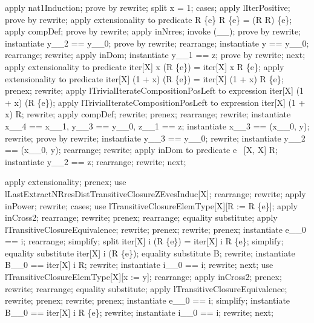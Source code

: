 \begin{LPScript}\begin{forget}[lLastExtractNRresDistTransitiveClosureZEvesInduc]
apply nat1Induction;
prove by rewrite;
split x = 1;
cases;
apply lIterPositive;
prove by rewrite;
apply extensionality to predicate
    R \nrres [X, X] \{e\} \comp [X, X, X] R \nrres [X, X] \{e\} =
    (R \comp [X, X, X] R) \nrres [X, X] \{e\};
apply compDef;
prove by rewrite;
apply inNrres;
invoke (\_\rel \_);
prove by rewrite;
instantiate y\_\_2 == y\_\_0;
prove by rewrite;
rearrange;
instantiate y == y\_\_0;
rearrange;
rewrite;
apply inDom;
instantiate y\_\_1 == z;
prove by rewrite;
next;
apply extensionality to predicate
    iter[X] x (R \nrres [X, X] \{e\}) = iter[X] x R \nrres [X, X] \{e\};
apply extensionality to predicate
    iter[X] (1 + x) (R \nrres [X, X] \{e\}) = iter[X] (1 + x) R \nrres [X, X] \{e\};
prenex;
rewrite;
apply lTrivialIterateCompositionPosLeft
    to expression iter[X] (1 + x) (R \nrres [X, X] \{e\});
apply lTrivialIterateCompositionPosLeft
    to expression iter[X] (1 + x) R;
rewrite;
apply compDef;
rewrite;
prenex;
rearrange;
rewrite;
instantiate x\_\_4 == x\_\_1, y\_\_3 == y\_\_0, z\_\_1 == z;
instantiate x\_\_3 == (x\_\_0, y);
rewrite;
prove by rewrite;
instantiate y\_\_3 == y\_\_0;
rewrite;
instantiate y\_\_2 == (x\_\_0, y);
rearrange;
rewrite;
apply inDom to predicate e \in  \dom~[X, X] R;
instantiate y\_\_2 == z;
rearrange;
rewrite;
next;
\end{forget}\end{LPScript}

\begin{LPScript}\begin{forget}[lLastExtractNRresDistTransitiveClosure]
apply extensionality;
prenex;
use lLastExtractNRresDistTransitiveClosureZEvesInduc[X];
rearrange;
rewrite;
apply inPower;
rewrite;
cases;
use lTransitiveClosureElemType[X][R := R \nrres [X, X] \{e\}];
apply inCross2;
rearrange;
rewrite;
prenex;
rearrange;
equality substitute;
apply lTransitiveClosureEquivalence;
rewrite;
prenex;
rewrite;
prenex;
instantiate e\_\_0 == i;
rearrange;
simplify;
split iter[X] i (R \nrres [X, X] \{e\}) = iter[X] i R \nrres [X, X] \{e\};
simplify;
equality substitute iter[X] i (R \nrres [X, X] \{e\});
equality substitute B;
rewrite;
instantiate B\_\_0 == iter[X] i R;
rewrite;
instantiate i\_\_0 == i;
rewrite;
next;
use lTransitiveClosureElemType[X][x := y];
rearrange;
apply inCross2;
prenex;
rewrite;
rearrange;
equality substitute;
apply lTransitiveClosureEquivalence;
rewrite;
prenex;
rewrite;
prenex;
instantiate e\_\_0 == i;
simplify;
instantiate B\_\_0 == iter[X] i R \nrres [X, X] \{e\};
rewrite;
instantiate i\_\_0 == i;
rewrite;
next;
\end{forget}\end{LPScript}

